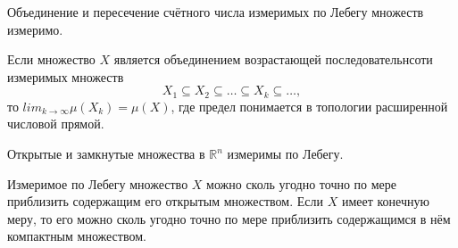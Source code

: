 
\begin{to_thr}
\label{meas_1}
     Объединение и пересечение счётного числа измеримых по Лебегу множеств измеримо. 
\end{to_thr}

\begin{to_thr}
\label{meas_2}
    Если множество $X$ является объединением возрастающей последовательнсоти измеримых множеств
    $$X_1 \subseteq X_2 \subseteq \dots \subseteq X_k \subseteq \dots,$$
    то $lim_{k \to \infty} \mu(X_k) = \mu(X)$, где предел понимается в топологии расширенной числовой прямой. 
\end{to_thr}

\begin{to_thr}
\label{meas_3}
    Открытые и замкнутые множества в $\mathbb{R}^n$ измеримы по Лебегу. 
\end{to_thr}

\begin{to_thr}
\label{meas_4}
    Измеримое по Лебегу множество $X$ можно сколь угодно точно по мере приблизить содержащим его открытым множеством. Если $X$ имеет конечную меру, то его можно сколь угодно точно по мере приблизить содержащимся в нём компактным множеством.
\end{to_thr}



